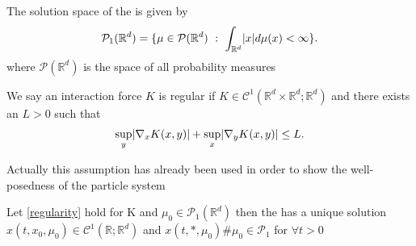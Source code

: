 \begin{remark}
  The solution space  of the  is  given by 
  \begin{align*}
    \mathcal{P}_1(\mathbb{R}^{d} ) = \{\mu \in \mathcal{P}(\mathbb{R}^{d} ) \ : \ \int_{\mathbb{R}^{d} } \lvert x\rvert d \mu(x) <\infty\}  
  .\end{align*}
  where $\mathcal{P}(\mathbb{R}^{d} )$ is the space of all probability measures
\end{remark}
\begin{assumption}[Regularity]\label{regularity}
 We say an interaction force $K$ is regular if $K \in  \mathcal{C}^{1}(\mathbb{R}^{d} \times  \mathbb{R}^{d} ; \mathbb{R}^{d}   ) $ and there exists
 an $L > 0$ such that 
 \begin{align*}
   \sup_{y} \lvert\nabla_x K(x,y)\rvert + \sup_{x} \lvert\nabla_y K(x,y)\rvert \le L
 .\end{align*}
\end{assumption}
Actually this assumption has already been used in order to show the well-posedness of the particle system
\newpage
\begin{theorem}\label{existence_uniqueness_char}
  Let \autoref{regularity} hold for K and $\mu_0 \in \mathcal{P}_1(\mathbb{R}^{d} )$ then the 
   has a unique solution $x(t,x_{0},\mu_0) \in  \mathcal{C}^{1}(\mathbb{R};\mathbb{R}^{d}  ) $
  and $x(t,*,\mu_0) \# \mu_0 \in  \mathcal{P}_1 $ for $\forall t > 0$
\end{theorem}
